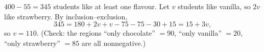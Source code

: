 $400-55=345$ students like at least one flavour. Let $v$ students like vanilla, so $2v$ like strawberry. By inclusion--exclusion,
\[345=180+2v+v-75-75-30+15=15+3v,\]
so $v=\boxed{110}$. (Check: the regions ``only chocolate'' $=90$, ``only vanilla'' $=20$, ``only strawberry'' $=85$ are all nonnegative.)
